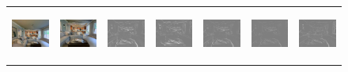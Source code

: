 \documentclass[letterpaper, 10 pt, conference]{ieeeconf}  %
\begin{document}
\begin{figure}[h!]
\begin{center}
\begin{tabular}{|c| c |c | c | c | c | c|}
 \\ \hline
\includegraphics[width=18mm, height=17mm]{TrueDepth/BALLOU/init.png} &   
            \includegraphics[width=18mm, height=17mm]{TrueDepth/BALLOU/des.png} & 
            \includegraphics[width=18mm,height=17mm]{PhotoVS/BALLOU/ferror.png} & 
           \includegraphics[width=18mm, height=17mm]{ICRA17/BALLOU/ferror.png} & 
 \includegraphics[width=18mm, height=17mm]{TrueDepth/BALLOU/ferror.png} &
  \includegraphics[width=18mm, height=17mm]{DepthNetwork/BALLOU/ferror.png} &
    \includegraphics[width=18mm, height=17mm]{FlowDepth/BALLOU/ferror.png}


\end{tabular}
\end{center}
\end{figure}
\end{document}

